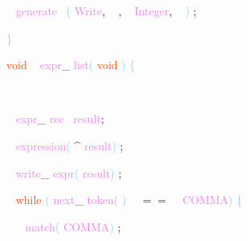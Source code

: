 \documentclass[8, usernames, dvipsnames]{beamer}
\begin{document}
\begin{frame}
\textcolor{White}{\ }
\textcolor{Violet}{generate}\textcolor{White}{\ }
\textcolor{SkyBlue}{(}
\textcolor{Violet}{Write}\textcolor{Sepia}{,}
\textcolor{White}{\ }
\textcolor{Sepia}{,}
\textcolor{White}{\ }
\textcolor{Violet}{Integer}\textcolor{Sepia}{,}
\textcolor{White}{\ }
\textcolor{SkyBlue}{)}
\textcolor{Sepia}{;}

 \textcolor{SkyBlue}{\} }

 
 \textcolor{OrangeRed}{void}
\textcolor{White}{\ }
\textcolor{Violet}{expr}\textcolor{Sepia}{\_}
\textcolor{Violet}{list}\textcolor{SkyBlue}{(}
\textcolor{OrangeRed}{void}
\textcolor{SkyBlue}{)}
\textcolor{SkyBlue}{\{ }

 \textcolor{White}{\   }

 \textcolor{White}{\   }
\textcolor{Violet}{expr}\textcolor{Sepia}{\_}
\textcolor{Violet}{rec}\textcolor{White}{\ }
\textcolor{Violet}{result}\textcolor{Sepia}{;}

 \textcolor{White}{\   }
\textcolor{Violet}{expression}\textcolor{SkyBlue}{(}
\textcolor{MidnightBlue}{\textasciicircum}
\textcolor{Violet}{result}\textcolor{SkyBlue}{)}
\textcolor{Sepia}{;}

 \textcolor{White}{\   }
\textcolor{Violet}{write}\textcolor{Sepia}{\_}
\textcolor{Violet}{expr}\textcolor{SkyBlue}{(}
\textcolor{Violet}{result}\textcolor{SkyBlue}{)}
\textcolor{Sepia}{;}

 \textcolor{White}{\   }
\textcolor{OrangeRed}{while}
\textcolor{SkyBlue}{(}
\textcolor{Violet}{next}\textcolor{Sepia}{\_}
\textcolor{Violet}{token}\textcolor{SkyBlue}{(}
\textcolor{SkyBlue}{)}
\textcolor{White}{\ }
\textcolor{OliveGreen}{$==$}
\textcolor{White}{\ }
\textcolor{Violet}{COMMA}\textcolor{SkyBlue}{)}
\textcolor{SkyBlue}{\{ }

 \textcolor{White}{\   }
\textcolor{White}{\   }
\textcolor{Violet}{match}\textcolor{SkyBlue}{(}
\textcolor{Violet}{COMMA}\textcolor{SkyBlue}{)}
\textcolor{Sepia}{;}

 \end{frame}
\end{document}
